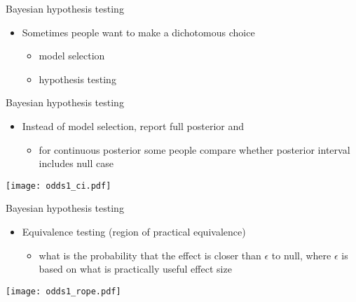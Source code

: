 \documentclass[english,t]{beamer}
\begin{document}
\begin{frame}{Bayesian hypothesis testing}

  \begin{itemize}
  \item Sometimes people want to make a dichotomous choice
    \begin{itemize}
    \item model selection
    \item hypothesis testing
    \end{itemize}
  \end{itemize}

\end{frame}

\begin{frame}{Bayesian hypothesis testing}

  \begin{itemize}
  \item Instead of model selection, report full posterior {and}
    \begin{itemize}
      \item for continuous posterior some people compare whether
        posterior interval includes null case
    \end{itemize}
  \end{itemize}
  
  {\texttt{[image: odds1\_ci.pdf]}}
  
\end{frame}

\begin{frame}{Bayesian hypothesis testing}

  \begin{itemize}
  \item Equivalence testing (region of practical equivalence)
    \begin{itemize}
    \item what is the probability that the effect is closer than
      $\epsilon$ to null, where $\epsilon$ is based on what is
      practically useful effect size
    \end{itemize}
  \end{itemize}

    {\texttt{[image: odds1\_rope.pdf]}}

\end{frame}
\end{document}
